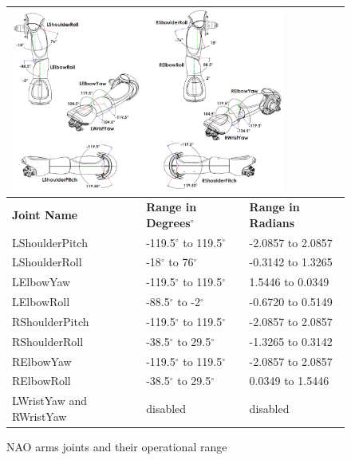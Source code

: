 \begin{figure}
\begin{tabular}{|p{5cm}|p{5cm}|p{5cm}|}
\multicolumn{3}{p{15cm}}{\centering \includegraphics[height = 6.0cm]{Figures/armsjoints.png}} \\ \hline
\textbf{Joint Name} & \textbf{Range in Degrees$^{\circ}$} & \textbf{Range in Radians} \\ \hline
LShoulderPitch & -119.5$^{\circ}$ to 119.5$^{\circ}$ & -2.0857 to 2.0857 \\ \hline
LShoulderRoll & -18$^{\circ}$ to 76$^{\circ}$ & -0.3142 to 1.3265 \\ \hline
LElbowYaw & -119.5$^{\circ}$ to 119.5$^{\circ}$ & 1.5446 to 0.0349 \\ \hline
LElbowRoll & -88.5$^{\circ}$ to -2$^{\circ}$ & -0.6720 to 0.5149 \\ \hline
RShoulderPitch & -119.5$^{\circ}$ to 119.5$^{\circ}$ & -2.0857 to 2.0857 \\ \hline
RShoulderRoll & -38.5$^{\circ}$ to 29.5$^{\circ}$ & -1.3265 to 0.3142 \\ \hline
RElbowYaw & -119.5$^{\circ}$ to 119.5$^{\circ}$ & -2.0857 to 2.0857 \\ \hline
RElbowRoll & -38.5$^{\circ}$ to 29.5$^{\circ}$ & 0.0349 to 1.5446 \\ \hline
LWristYaw and RWristYaw & disabled & disabled \\ \hline
\end{tabular}
\caption{NAO arms joints and their operational range}
\label{fig:ajoints}
\end{figure}

